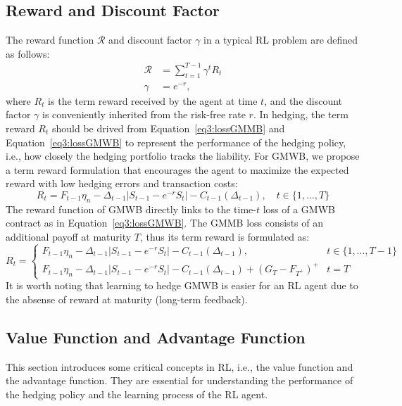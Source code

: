 \subsection{Reward and Discount Factor}
The reward function $\mathcal{R}$ and discount factor $\gamma$ in a typical RL problem are defined as follows:
\begin{align}
    \mathcal{R} & = \sum_{t=1}^{T-1} \gamma^t R_t \\
    \gamma      & = e^{-r}, \nonumber
\end{align}
where $R_t$ is the term reward received by the agent at time $t$, and the discount factor $\gamma$ is conveniently inherited from the risk-free rate $r$. 
In hedging, the term reward $R_t$ should be drived from Equation~\ref{eq3:lossGMMB} and Equation~\ref{eq3:lossGMWB} to represent the performance of the hedging policy, i.e., how closely the hedging portfolio tracks the liability.
For GMWB, we propose a term reward formulation that encourages the agent to maximize the expected reward with low hedging errors and transaction costs:
\begin{equation} \label{eq3:rewardGMWB}
    R_t = F_{t-1}\eta_n - \Delta_{t-1} |S_{t-1} - e^{-r}S_{t}| - C_{t-1}(\Delta_{t-1}), \quad t \in \{1,\ldots,T \}
\end{equation}
The reward function of GMWB directly links to the time-$t$ loss of a GMWB contract as in Equation~\ref{eq3:lossGMWB}.
The GMMB loss consists of an additional payoff at maturity $T$, thus its term reward is formulated as:
\begin{equation} \label{eq3:rewardGMMB}
    R_t = 
    \begin{cases}
    F_{t-1}\eta_n - \Delta_{t-1} |S_{t-1} - e^{-r}S_{t}| - C_{t-1}(\Delta_{t-1}),                         & t\in \{1,\ldots,T-1 \} \\
    F_{t-1}\eta_n - \Delta_{t-1} |S_{t-1} - e^{-r}S_{t}| - C_{t-1}(\Delta_{t-1}) + (G_T - F_{T^+})^+      & t = T
    \end{cases}
\end{equation}
It is worth noting that learning to hedge GMWB is easier for an RL agent due to the absense of reward at maturity (long-term feedback).

\subsection{Value Function and Advantage Function}

This section introduces some critical concepts in RL, i.e., the value function and the advantage function.
They are essential for understanding the performance of the hedging policy and the learning process of the RL agent.

